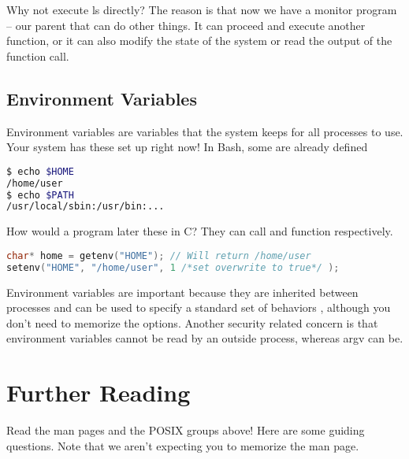 Why not execute ls directly?
The reason is that now we have a monitor program -- our parent that can do other things.
It can proceed and execute another function, or it can also modify the state of the system or read the output of the function call.

\subsection{Environment Variables}

Environment variables are variables that the system keeps for all processes to use.
Your system has these set up right now!
In Bash, some are already defined

\begin{lstlisting}[language=bash]
$ echo $HOME
/home/user
$ echo $PATH
/usr/local/sbin:/usr/bin:...
\end{lstlisting}

How would a program later these in C?
They can call  and  function respectively.

\begin{lstlisting}[language=C]
char* home = getenv("HOME"); // Will return /home/user
setenv("HOME", "/home/user", 1 /*set overwrite to true*/ );
\end{lstlisting}

Environment variables are important because they are inherited between processes and can be used to specify a standard set of behaviors \cite{env_std_2018}, although you don't need to memorize the options.
Another security related concern is that environment variables cannot be read by an outside process, whereas argv can be.

\section{Further Reading}

Read the man pages and the POSIX groups above!
Here are some guiding questions.
Note that we aren't expecting you to memorize the man page.

